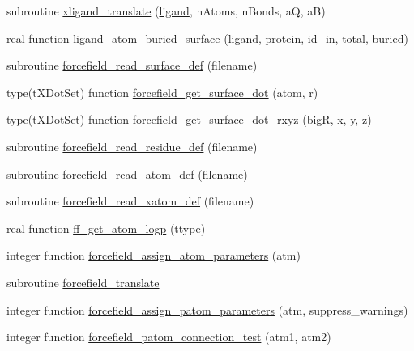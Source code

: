 \begin{DoxyCompactItemize}
subroutine \hyperlink{classcalc__xscore_a760c0fca71e74036817c42a118d6d0cb}{xligand\-\_\-translate} (\hyperlink{classcalc__xscore_ad2efc1238a463be4b83681419cd6b113}{ligand}, n\-Atoms, n\-Bonds, a\-Q, a\-B)
\item 
real function \hyperlink{classcalc__xscore_a74e877e2e455f77a9d0fcf7c093d7dfe}{ligand\-\_\-atom\-\_\-buried\-\_\-surface} (\hyperlink{classcalc__xscore_ad2efc1238a463be4b83681419cd6b113}{ligand}, \hyperlink{classcalc__xscore_a98803b585e24ba9794bf16dc263374dc}{protein}, id\-\_\-in, total, buried)
\item 
subroutine \hyperlink{classcalc__xscore_a1b46e2d13840f2131430c94c2a40e291}{forcefield\-\_\-read\-\_\-surface\-\_\-def} (filename)
\item 
type(t\-X\-Dot\-Set) function \hyperlink{classcalc__xscore_a322d4b17c21b217bff596c3bb2d713f3}{forcefield\-\_\-get\-\_\-surface\-\_\-dot} (atom, r)
\item 
type(t\-X\-Dot\-Set) function \hyperlink{classcalc__xscore_ae51c7abd02ba40925ad1b60e0d62b5e7}{forcefield\-\_\-get\-\_\-surface\-\_\-dot\-\_\-rxyz} (big\-R, x, y, z)
\item 
subroutine \hyperlink{classcalc__xscore_afe826739594a908f79d4ce0e361aecb2}{forcefield\-\_\-read\-\_\-residue\-\_\-def} (filename)
\item 
subroutine \hyperlink{classcalc__xscore_ab919b97ffae7e9807fc6a9a6c1ac1410}{forcefield\-\_\-read\-\_\-atom\-\_\-def} (filename)
\item 
subroutine \hyperlink{classcalc__xscore_a6584668d9c3891d47c06c70a33b4b04f}{forcefield\-\_\-read\-\_\-xatom\-\_\-def} (filename)
\item 
real function \hyperlink{classcalc__xscore_a09fea1cbc4a077394a0e7a27a5b2aed1}{ff\-\_\-get\-\_\-atom\-\_\-logp} (ttype)
\item 
integer function \hyperlink{classcalc__xscore_ac9efa5bb92eb7358abac6117b6f99b02}{forcefield\-\_\-assign\-\_\-atom\-\_\-parameters} (atm)
\item 
subroutine \hyperlink{classcalc__xscore_a5f39869aa94f88289fc96d74e2389604}{forcefield\-\_\-translate}
\item 
integer function \hyperlink{classcalc__xscore_a5825beca50933a98d0ba36100f61089f}{forcefield\-\_\-assign\-\_\-patom\-\_\-parameters} (atm, suppress\-\_\-warnings)
\item 
integer function \hyperlink{classcalc__xscore_a151331c48b7b628bd2007a1c31412df8}{forcefield\-\_\-patom\-\_\-connection\-\_\-test} (atm1, atm2)
\item 

\end{DoxyCompactItemize}
